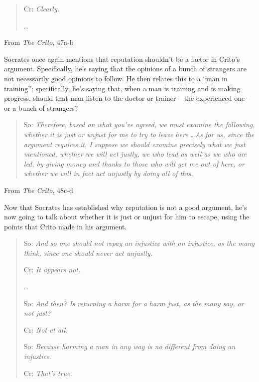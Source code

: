 \documentclass[letterpaper]{article}
\begin{document}
\begin{itemize}
\begin{mdframed}[]
\begin{quotation}
            Cr: \emph{Clearly.}

            \dots
        \end{quotation}
        From \emph{The Crito}, 47a-b
    \end{mdframed}
    Socrates once again mentions that reputation shouldn't be a factor in Crito's argument. Specifically, he's saying that the opinions of a bunch of strangers are not necessarily good opinions to follow. He then relates this to a ``man in training''; specifically, he's saying that, when a man is training and is making progress, should that man listen to the doctor or trainer -- the experienced one -- or a bunch of strangers? 

    \begin{mdframed}[]
        \begin{quotation}
            So: \emph{Therefore, based on what you've agreed, we must examine the following, whether it is just or unjust for me to try to leave here} \dots \emph{As for us, since the argument requires it, I suppose we should examine precisely what we just mentioned, whether we will act justly, we who lead as well as we who are led, by giving money and thanks to those who will get me out of here, or whether we will in fact act unjustly by doing all of this.}
        \end{quotation}
        From \emph{The Crito}, 48c-d
    \end{mdframed}
    Now that Socrates has established why reputation is not a good argument, he's now going to talk about whether it is just or unjust for him to escape, using the points that Crito made in his argument. 

    \begin{mdframed}[]
        \begin{quotation}
            So: \emph{And so one should not repay an injustice with an injustice, as the many think, since one should never act unjustly.}

            Cr: \emph{It appears not.}

            \dots

            So: \emph{And then? Is returning a harm for a harm just, as the many say,
            or not just?}

            Cr: \emph{Not at all.}

            So: \emph{Because harming a man in any way is no different from doing an injustice.}

            Cr: \emph{That's true.}


\end{quotation}
\end{mdframed}
\end{itemize}
\end{document}
